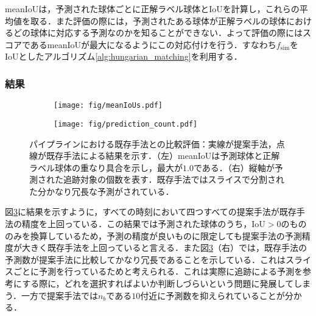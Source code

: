         meanIoUは，予測された球体ごとに正解ラベル球体とIoUを計算し，これらの平均値を取る．また評価の際には，予測されたある球体が正解ラベルの球体におけるどの球体に対応する予測なのかを知ることができない．よって評価の際にはスコアであるmeanIoUが最大になるようにこの対応付けを行う．すなわち$f_{\text{sim}}$をIoUとしたアルゴリズム\ref{alg:hungarian_matching}を利用する．

        \subsubsection{結果}

        \begin{figure}[t]
            \begin{subfigure}[b]{0.5\linewidth}
                \centering
                \texttt{[image: fig/meanIoUs.pdf]}
                \label{fig:meanIoU_pipeline}
            \end{subfigure}
            \hfill
            \begin{subfigure}[b]{0.5\linewidth}
                \centering
                \texttt{[image: fig/prediction\_count.pdf]} 
                \label{fig:prediction_count}
            \end{subfigure}
            \vspace{-3zh}
            \caption[パイプラインにおける既存手法との比較評価]{パイプラインにおける既存手法との比較評価：実線が提案手法，点線が既存手法による結果を示す．（左）meanIoUは予測球体と正解ラベル球体の重なり具合を示し，最大が$1.0$である．（右）縦軸が予測された追跡対象の個数を表す．既存手法ではスライスで分割された分かなり冗長な予測がされている．}
            \label{fig:pipeline_assessment}
        \end{figure}
        
        図\ref{fig:pipeline_assessment}に結果を示すように，すべての時刻において四つすべての提案手法が既存手法の精度を上回っている．この結果では予測された球体のうち，IoU$ > 0$のもののみを換算しているため，予測の精度が良いものに限定しても提案手法の予測精度が大きく既存手法を上回っていると言える．また図\ref{fig:pipeline_assessment}（右）では，既存手法の予測数が提案手法に比較してかなり冗長であることを示している．これはスライスごとに予測を行っているためと考えられる．これは実際に追跡による予測を参考にする際に，どれを選択すればよいか判断しづらいという問題に発展してしまう．一方で提案手法では$n_b$である$10$付近に予測数を抑えられていることが分かる．


